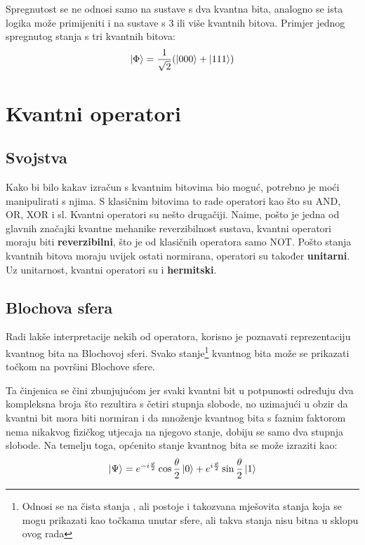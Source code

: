 Spregnutost se ne odnosi samo na sustave s dva kvantna bita, analogno se ista logika može primijeniti i na sustave s 3 ili više kvantnih bitova. Primjer jednog spregnutog stanja s tri kvantnih bitova:
\[
\ket{\Phi} = \frac{1}{\sqrt{2}}(\ket{000} + \ket{111})
\]




\section{Kvantni operatori}

\subsection{Svojstva}

Kako bi bilo kakav izračun s kvantnim bitovima bio moguć, potrebno je moći manipulirati s njima. S klasičnim bitovima to rade operatori kao što su AND, OR, XOR i sl. Kvantni operatori su nešto drugačiji. Naime, pošto je jedna od glavnih značajki kvantne mehanike reverzibilnost sustava, kvantni operatori moraju biti \textbf{reverzibilni}, što je od klasičnih operatora samo NOT. Pošto stanja kvantnih bitova moraju uvijek ostati normirana, operatori su također \textbf{unitarni}. Uz unitarnost, kvantni operatori su i \textbf{hermitski}.

\subsection{Blochova sfera}

Radi lakše interpretacije nekih od operatora, korisno je poznavati reprezentaciju kvantnog bita na Blochovoj sferi. Svako stanje\footnote{Odnosi se na čista stanja , ali postoje i takozvana mješovita stanja koja se mogu prikazati kao točkama unutar sfere, ali takva stanja nisu bitna u sklopu ovog rada} kvantnog bita može se prikazati točkom na površini Blochove sfere.

Ta činjenica se čini zbunjujućom jer svaki kvantni bit u potpunosti određuju dva kompleksna broja što rezultira s četiri stupnja slobode, no uzimajući u obzir da kvantni bit mora biti normiran i da množenje kvantnog bita s faznim faktorom nema nikakvog fizičkog utjecaja na njegovo stanje, dobiju se samo dva stupnja slobode. Na temelju toga, općenito stanje kvantnog bita se može izraziti kao:
\[
\ket{\Psi} = e^{-i\frac{\varphi}{2}}\cos\frac{\theta}{2}\ket{0} + e^{i\frac{\varphi}{2}}\sin\frac{\theta}{2}\ket{1}
\]


